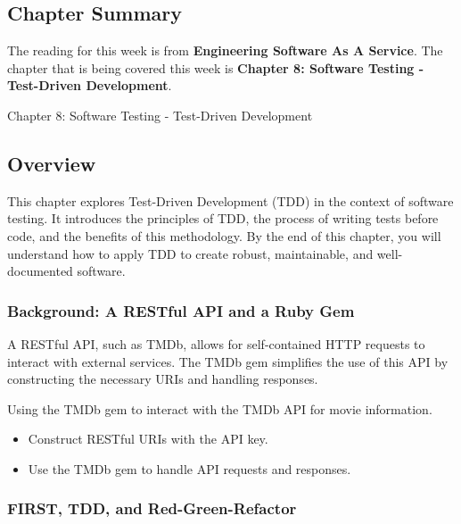 \subsection{Chapter Summary}

The reading for this week is from \textbf{Engineering Software As A Service}. The chapter that is being covered this week is \textbf{Chapter 8: Software Testing - Test-Driven Development}.

\begin{notes}{Chapter 8: Software Testing - Test-Driven Development}
    \subsection*{Overview}

    This chapter explores Test-Driven Development (TDD) in the context of software testing. It introduces the principles of TDD, the process of writing tests before code, and the benefits of this 
    methodology. By the end of this chapter, you will understand how to apply TDD to create robust, maintainable, and well-documented software.
    
    \subsubsection*{Background: A RESTful API and a Ruby Gem}
    
    A RESTful API, such as TMDb, allows for self-contained HTTP requests to interact with external services. The TMDb gem simplifies the use of this API by constructing the necessary URIs and handling responses.
    
    \begin{highlight}
    
        Using the TMDb gem to interact with the TMDb API for movie information.
        
        \begin{itemize}
            \item Construct RESTful URIs with the API key.
            \item Use the TMDb gem to handle API requests and responses.
        \end{itemize}
    
    \end{highlight}
    
    \subsubsection*{FIRST, TDD, and Red-Green-Refactor}
    

\end{notes}
